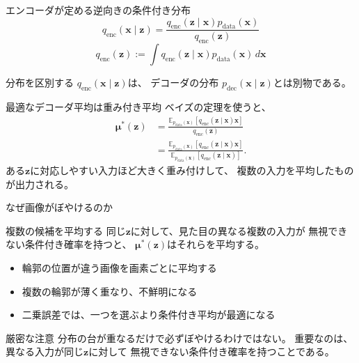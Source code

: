 \begin{frame}{エンコーダが定める逆向きの条件付き分布}
    \small
    \[
        q_{\mathrm{enc}}(\boldsymbol{x}\mid\boldsymbol{z})
        =
        \frac{
        q_{\mathrm{enc}}(\boldsymbol{z}\mid\boldsymbol{x})
        p_{\mathrm{data}}(\boldsymbol{x})
        }{
        q_{\mathrm{enc}}(\boldsymbol{z})
        }
    \]
    \[
        q_{\mathrm{enc}}(\boldsymbol{z})
        :=
        \int q_{\mathrm{enc}}(\boldsymbol{z}\mid\boldsymbol{x})
        p_{\mathrm{data}}(\boldsymbol{x})\,d\boldsymbol{x}
    \]
    \normalsize
    \begin{alertblock}{分布を区別する}
        $q_{\mathrm{enc}}(\boldsymbol{x}\mid\boldsymbol{z})$は、
        デコーダの分布
        $p_{\mathrm{dec}}(\boldsymbol{x}\mid\boldsymbol{z})$とは別物である。
    \end{alertblock}
\end{frame}
\begin{frame}{最適なデコーダ平均は重み付き平均}
    ベイズの定理を使うと、
    \small
    \begin{align*}
        \boldsymbol{\mu}^{*}(\boldsymbol{z})
        &=
        \frac{
        \mathbb{E}_{p_{\mathrm{data}}(\boldsymbol{x})}
        [q_{\mathrm{enc}}(\boldsymbol{z}\mid\boldsymbol{x})
        \boldsymbol{x}]
        }{
        q_{\mathrm{enc}}(\boldsymbol{z})
        }\\
        &=
        \frac{
        \mathbb{E}_{p_{\mathrm{data}}(\boldsymbol{x})}
        [q_{\mathrm{enc}}(\boldsymbol{z}\mid\boldsymbol{x})
        \boldsymbol{x}]
        }{
        \mathbb{E}_{p_{\mathrm{data}}(\boldsymbol{x})}
        [q_{\mathrm{enc}}(\boldsymbol{z}\mid\boldsymbol{x})]
        }.
    \end{align*}
    \normalsize
    ある$\boldsymbol{z}$に対応しやすい入力ほど大きく重み付けして、
    複数の入力を平均したものが出力される。
\end{frame}
\begin{frame}{なぜ画像がぼやけるのか}
    \begin{block}{複数の候補を平均する}
        同じ$\boldsymbol{z}$に対して、見た目の異なる複数の入力が
        無視できない条件付き確率を持つと、
        $\boldsymbol{\mu}^{*}(\boldsymbol{z})$はそれらを平均する。
    \end{block}
    \begin{itemize}
        \item 輪郭の位置が違う画像を画素ごとに平均する
        \item 複数の輪郭が薄く重なり、不鮮明になる
        \item 二乗誤差では、一つを選ぶより条件付き平均が最適になる
    \end{itemize}
    \begin{alertblock}{厳密な注意}
        分布の台が重なるだけで必ずぼやけるわけではない。
        重要なのは、異なる入力が同じ$\boldsymbol{z}$に対して
        無視できない条件付き確率を持つことである。
    \end{alertblock}
\end{frame}

